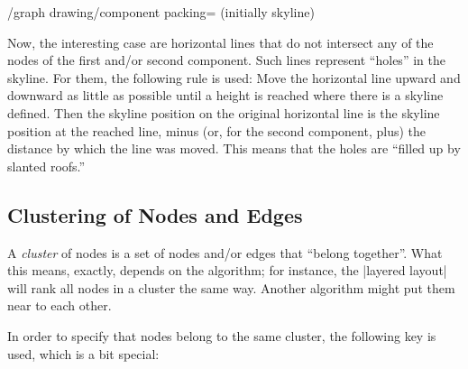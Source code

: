 \begin{key}{/graph drawing/component packing= (initially
    skyline)}
\begin{itemize}
    Now, the interesting case are horizontal lines that do not
    intersect any of the nodes of the first and/or second
    component. Such lines represent ``holes'' in the skyline. For
    them, the following rule is used: Move the horizontal line upward
    and downward as little as possible until a height is reached where
    there is a skyline defined. Then the skyline position on the
    original horizontal line is the skyline position at the reached
    line, minus (or, for the second component, plus) the distance by
    which the line was moved. This means that the holes are ``filled
    up by slanted roofs.''
\begin{codeexample}[]
\end{codeexample}

\end{itemize}
\end{key}


\subsection{Clustering of Nodes and Edges}

A \emph{cluster} of nodes is a set of nodes and/or edges that ``belong
together''. What this means, exactly, depends on the algorithm; for
instance, the |layered layout| will rank all nodes in a cluster the
same way. Another algorithm might put them near to each other.

In order to specify that nodes belong to the same cluster, the
following key is used, which is a bit special:

